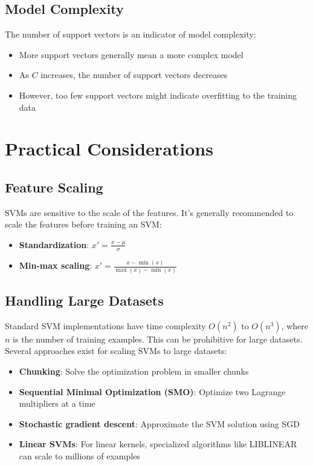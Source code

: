 \documentclass{article}
\begin{document}
\subsection{Model Complexity}
The number of support vectors is an indicator of model complexity:

\begin{itemize}
    \item More support vectors generally mean a more complex model
    \item As $C$ increases, the number of support vectors decreases
    \item However, too few support vectors might indicate overfitting to the training data
\end{itemize}

\section{Practical Considerations}

\subsection{Feature Scaling}
SVMs are sensitive to the scale of the features. It's generally recommended to scale the features before training an SVM:

\begin{itemize}
    \item \textbf{Standardization}: $x' = \frac{x - \mu}{\sigma}$
    \item \textbf{Min-max scaling}: $x' = \frac{x - \min(x)}{\max(x) - \min(x)}$
\end{itemize}

\subsection{Handling Large Datasets}
Standard SVM implementations have time complexity $O(n^2)$ to $O(n^3)$, where $n$ is the number of training examples. This can be prohibitive for large datasets. Several approaches exist for scaling SVMs to large datasets:

\begin{itemize}
    \item \textbf{Chunking}: Solve the optimization problem in smaller chunks
    \item \textbf{Sequential Minimal Optimization (SMO)}: Optimize two Lagrange multipliers at a time
    \item \textbf{Stochastic gradient descent}: Approximate the SVM solution using SGD
    \item \textbf{Linear SVMs}: For linear kernels, specialized algorithms like LIBLINEAR can scale to millions of examples
\end{itemize}
\end{document}
